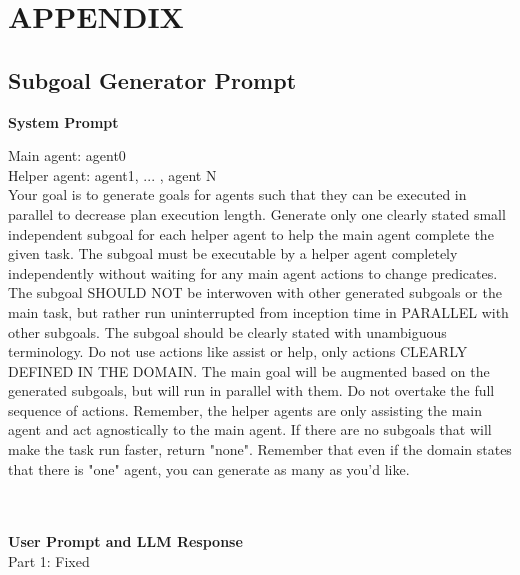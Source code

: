\newpage 
\section*{APPENDIX}
\subsection{Subgoal Generator Prompt}
\noindent \textbf{System Prompt}\\
\colorbox{blue!10}{
\begin{minipage}{0.95\columnwidth}
Main agent: agent0\\
Helper agent: agent1, ... , agent N\\
Your goal is to generate goals for agents such that they can be executed in parallel to decrease plan execution length. Generate only one clearly stated small independent subgoal for each helper agent to help the main agent complete the given task. The subgoal must be executable by a helper agent completely independently without waiting for any main agent actions to change predicates. The subgoal SHOULD NOT be interwoven with other generated subgoals or the main task, but rather run uninterrupted from inception time in PARALLEL with other subgoals.  
The subgoal should be clearly stated with unambiguous terminology. Do not use actions like assist or help, only actions CLEARLY DEFINED IN THE DOMAIN. The main goal will be augmented based on the generated subgoals, but will run in parallel with them. Do not overtake the full sequence of actions. Remember, the helper agents are only assisting the main agent and act agnostically to the main agent. If there are no subgoals that will make the task run faster, return "none". Remember that even if the domain states that there is "one" agent, you can generate as many as you'd like.
\end{minipage}
} \\ \\
\noindent \textbf{User Prompt and LLM Response}\\
Part 1: Fixed \\
